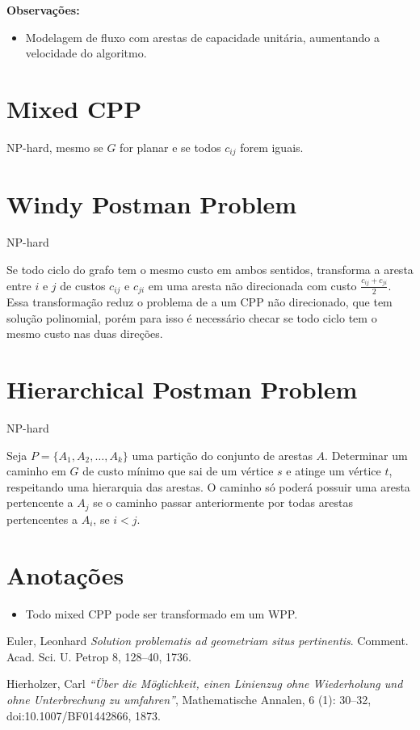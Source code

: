 \documentclass{article}
\begin{document}
	\textbf{Observações:}
	\begin{itemize}
		\item Modelagem de fluxo com arestas de capacidade unitária, aumentando a velocidade do algoritmo.
	\end{itemize}

	\section{Mixed CPP}

	NP-hard, mesmo se $G$ for planar e se todos $c_{ij}$ forem iguais.

	\section{Windy Postman Problem}

	NP-hard

	Se todo ciclo do grafo tem o mesmo custo em ambos sentidos, transforma a aresta entre $i$ e $j$ de custos $c_{ij}$ e $c_{ji}$ em uma aresta não direcionada com custo $\frac{c_{ij} + c_{ji}}{2}$. Essa transformação reduz o problema de a um CPP não direcionado, que tem solução polinomial, porém para isso é necessário checar se todo ciclo tem o mesmo custo nas duas direções.

	\section{Hierarchical Postman Problem}

	NP-hard 

	Seja $P = \{A_1, A_2, \dots, A_k\}$ uma partição do conjunto de arestas $A$. Determinar um caminho em $G$ de custo mínimo que sai de um vértice $s$ e atinge um vértice $t$, respeitando uma hierarquia das arestas. O caminho só poderá possuir uma aresta pertencente a $A_j$ se o caminho passar anteriormente por todas arestas pertencentes a $A_i$, se $i < j$.


	\section{Anotações}

	\begin{itemize}
		\item Todo mixed CPP pode ser transformado em um WPP.
	\end{itemize}

	\medskip

	\begin{thebibliography}{9}
	Euler, Leonhard
	\textit{Solution problematis ad geometriam situs pertinentis}. 
	Comment. Acad. Sci. U. Petrop 8, 128–40, 1736.

	Hierholzer, Carl
	\textit{``Über die Möglichkeit, einen Linienzug ohne Wiederholung und ohne Unterbrechung zu umfahren''}, 
	Mathematische Annalen, 6 (1): 30–32, doi:10.1007/BF01442866, 1873.
	\end{thebibliography}
 
\end{document}
